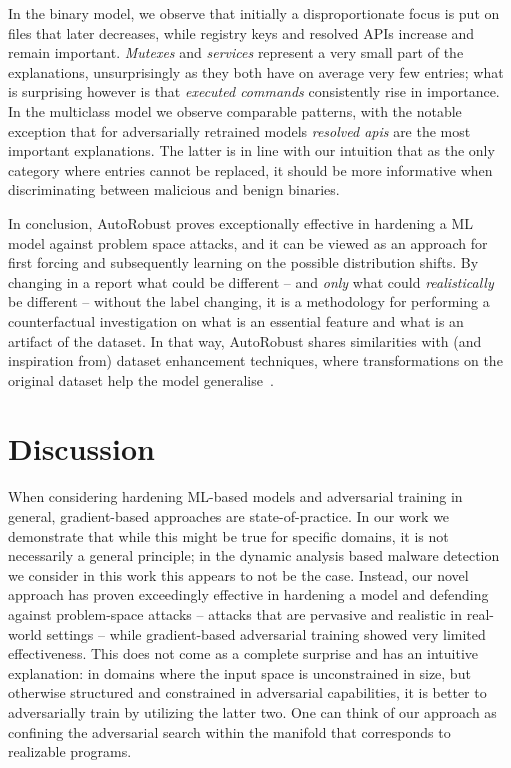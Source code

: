 In the binary model, we observe that initially a disproportionate focus is put on files that later decreases, while registry keys and resolved APIs increase and remain important.
\textit{Mutexes} and \textit{services} represent a very small part of the explanations, unsurprisingly as they both have on average very few entries; what is surprising however is that \textit{executed commands} consistently rise in importance.
In the multiclass model we observe comparable patterns, with the notable exception that for adversarially retrained models \textit{resolved apis} are the most important explanations.
The latter is in line with our intuition that as the only category where entries cannot be replaced, it should be more informative when discriminating between malicious and benign binaries.

In conclusion, AutoRobust proves exceptionally effective in hardening a ML model against problem space attacks, and it can be viewed as an approach for first forcing and subsequently learning on the possible distribution shifts.
By changing in a report what could be different -- and \textit{only} what could \textit{realistically} be different -- without the label changing, it is a methodology for performing a counterfactual investigation on what is an essential feature and what is an artifact of the dataset.
In that way, AutoRobust shares similarities with (and inspiration from) dataset enhancement techniques, where transformations on the original dataset help the model generalise~\cite{cubuk2018autoaugment}.

\section{Discussion}

When considering hardening ML-based models and adversarial training in general, gradient-based approaches are state-of-practice.
In our work we demonstrate that while this might be true for specific domains, it is not necessarily a general principle; in the dynamic analysis based malware detection we consider in this work this appears to not be the case.
Instead, our novel approach has proven exceedingly effective in hardening a model and defending against problem-space attacks -- attacks that are pervasive and realistic in real-world settings -- while gradient-based adversarial training showed very limited effectiveness.
This does not come as a complete surprise and has an intuitive explanation: in domains where the input space is unconstrained in size, but otherwise structured and constrained in adversarial capabilities, it is better to adversarially train by utilizing the latter two.
One can think of our approach as confining the adversarial search within the manifold that corresponds to realizable programs.

